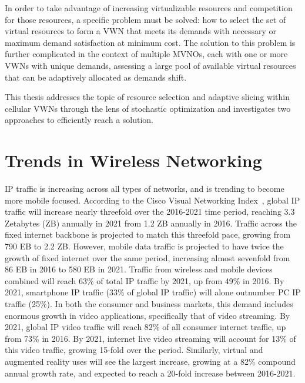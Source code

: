 \documentclass[12pt,dvipsnames]{report}
\begin{document}
In order to take advantage of increasing virtualizable resources and competition for those resources, a specific problem must be solved: how to select the set of virtual resources to form a VWN that meets its demands with necessary or maximum demand satisfaction at minimum cost.  The solution to this problem is further complicated in the context of multiple MVNOs, each with one or more VWNs with unique demands, assessing a large pool of available virtual resources that can be adaptively allocated as demands shift.

This thesis addresses the topic of resource selection and adaptive slicing within cellular VWNs through the lens of stochastic optimization and investigates two approaches to efficiently reach a solution.

\section{Trends in Wireless Networking} \label{sec:netreview}

IP traffic is increasing across all types of networks, and is trending to become more mobile focused.  According to the Cisco Visual Networking Index~\cite{ciscoVNI2017}, global IP traffic will increase nearly threefold over the 2016-2021 time period, reaching 3.3 Zetabytes (ZB) annually in 2021 from 1.2 ZB annually in 2016.  Traffic across the fixed internet backbone is projected to match this threefold pace, growing from 790 EB to 2.2 ZB.  However, mobile data traffic is projected to have twice the growth of fixed internet over the same period, increasing almost sevenfold from 86 EB in 2016 to 580 EB in 2021.  Traffic from wireless and mobile devices combined will reach 63\% of total IP traffic by 2021, up from 49\% in 2016.  By 2021, smartphone IP traffic (33\% of global IP traffic) will alone outnumber PC IP traffic (25\%).  In both the consumer and business markets, this demand includes enormous growth in video applications, specifically that of video streaming.  By 2021, global IP video traffic will reach 82\% of all consumer internet traffic, up from 73\% in 2016.  By 2021, internet live video streaming will account for 13\% of this video traffic, growing 15-fold over the period.  Similarly, virtual and augmented reality uses will see the largest increase, growing at a 82\% compound annual growth rate, and expected to reach a 20-fold increase between 2016-2021.
\end{document}
